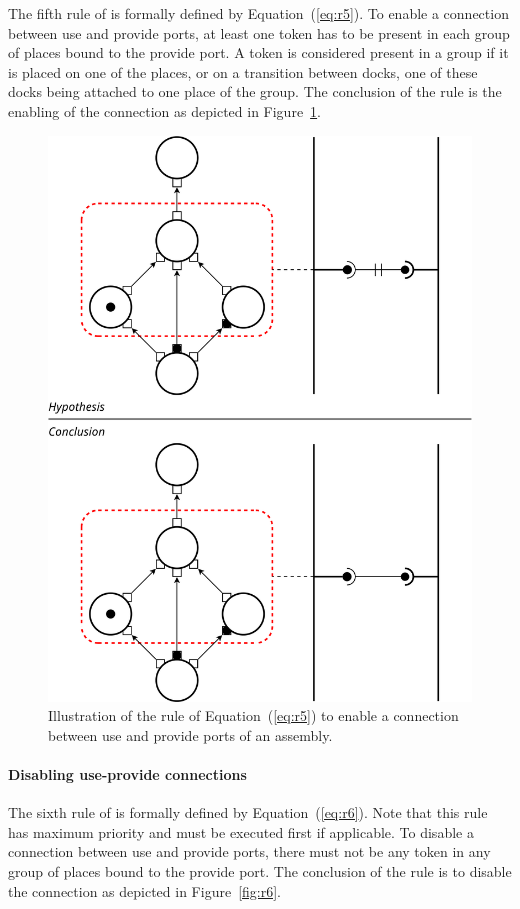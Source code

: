{{The fifth rule of \mad is formally defined by
Equation~(\ref{eq:r5}). To enable a connection between use and provide
ports, at least one token has to be present in each group of places
bound to the provide port. A token is considered present in a group if
it is placed on one of the places, or on a transition between docks,
one of these docks being attached to one place of the group. The
conclusion of the rule is the enabling of the connection as depicted
in Figure~\ref{fig:r5}.

\begin{figure}[t]
  \begin{center}
    \includegraphics[width=0.7\columnwidth]{./images/link_service.pdf}

    \caption{Illustration of the rule of Equation~(\ref{eq:r5}) to enable a
    connection between use and provide ports of an assembly.}

    \label{fig:r5}
  \end{center}
\end{figure}
  
}

\paragraph{Disabling use-provide connections}{

The sixth rule of \mad is formally defined by
Equation~(\ref{eq:r6}). Note that this rule has maximum priority and
must be executed first if applicable. To disable a connection between
use and provide ports, there must not be any token in any group of
places bound to the provide port. The conclusion of the rule is to disable
the connection as depicted in Figure~\ref{fig:r6}.

}}
